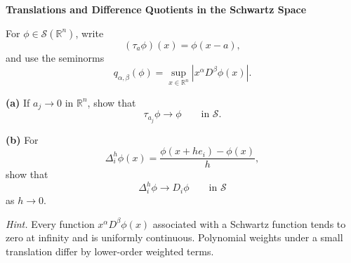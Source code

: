 \begin{problem}[CP-II-0569]
\label{prob:cp-ii-0569}
\textbf{Translations and Difference Quotients in the Schwartz Space}

\hspace*{1.5em}For \(\phi\in\mathcal S(\mathbb R^n)\), write
\[
(\tau_a\phi)(x)=\phi(x-a),
\]
and use the seminorms
\[
q_{\alpha,\beta}(\phi)
=
\sup_{x\in\mathbb R^n}|x^\alpha D^\beta\phi(x)|.
\]

\par\smallskip\noindent\textbf{(a)}\quad
If \(a_j\to0\) in \(\mathbb R^n\), show that
\[
\tau_{a_j}\phi\to\phi
\qquad\text{in }\mathcal S.
\]

\par\smallskip\noindent\textbf{(b)}\quad
For
\[
\Delta_i^h\phi(x)
=
\frac{\phi(x+he_i)-\phi(x)}{h},
\]
show that
\[
\Delta_i^h\phi\to D_i\phi
\qquad\text{in }\mathcal S
\]
as \(h\to0\).

\medskip
\noindent\emph{Hint.} Every function \(x^\alpha D^\beta\phi(x)\) associated with a Schwartz
function tends to zero at infinity and is uniformly continuous. Polynomial
weights under a small translation differ by lower-order weighted terms.
\end{problem}

